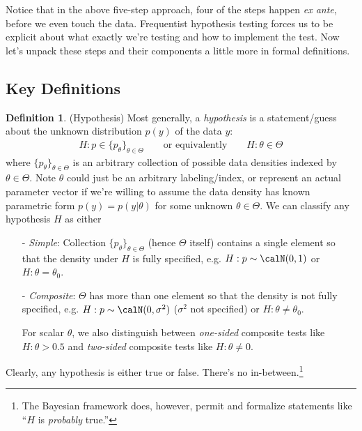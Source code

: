 \documentclass[12pt]{article}
\theoremstyle{plain}
\theoremstyle{definition}
\newtheorem{defn}[thm]{Definition}
\theoremstyle{remark}
\begin{document}
Notice that in the above five-step approach, four of the steps happen
\emph{ex ante}, before we even touch the data.
Frequentist hypothesis testing forces us to be explicit about what
exactly we're testing and how to implement the test.
Now let's unpack these steps and their components a little more in
formal definitions.


\clearpage
\subsection{Key Definitions}

\begin{defn}(Hypothesis)
Most generally, a \emph{hypothesis} is a statement/guess about the
unknown distribution $p(y)$ of the data $y$:
\begin{align*}
  H:p \in \{p_\theta\}_{\theta \in \Theta}
  \qquad \text{or equivalently}\qquad
  H: \theta \in \Theta
\end{align*}
where $\{p_\theta\}_{\theta \in \Theta}$ is an arbitrary collection of
possible data densities indexed by $\theta\in \Theta$.
Note $\theta$ could just be an arbitrary labeling/index, or represent an
actual parameter vector if we're willing to assume the data density has
known parametric form $p(y)=p(y|\theta)$ for some unknown
$\theta\in\Theta$.
We can classify any hypothesis $H$ as either
\begin{itemize}
  \item[-] \emph{Simple}:
    Collection $\{p_\theta\}_{\theta\in \Theta}$ (hence $\Theta$ itself)
    contains a single element so that the density under $H$ is fully
    specified, e.g.  $H:p\sim \calN(0,1)$ or $H: \theta = \theta_0$.

  \item[-] {\sl Composite}:
    $\Theta$ has more than one element so that the density is not fully
    specified, e.g. $H:p\sim \calN(0,\sigma^2)$ ($\sigma^2$ not
    specified) or $H:\theta\neq\theta_0$.

    For scalar $\theta$, we also distinguish between \emph{one-sided}
    composite tests like $H:\theta>0.5$ and
    \emph{two-sided} composite tests like $H:\theta\neq 0$.
\end{itemize}
Clearly, any hypothesis is either true or false. There's no
in-between.\footnote{%
  The Bayesian framework does, however, permit and formalize statements
  like ``$H$ is \emph{probably} true.''
}
\end{defn}
\end{document}
